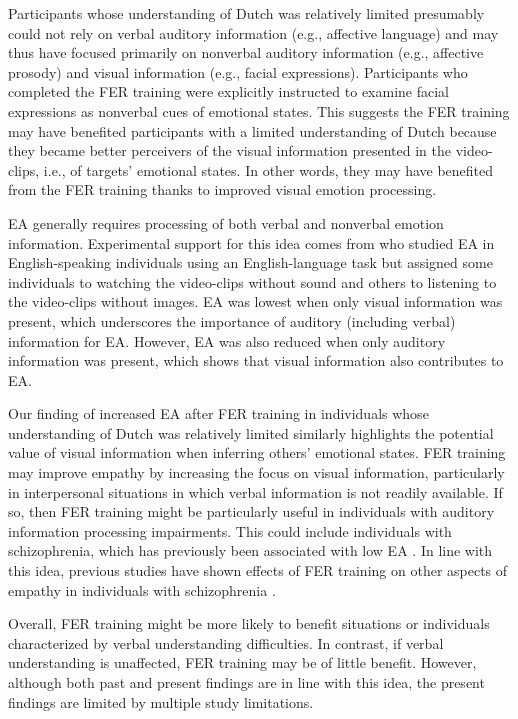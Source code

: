 \documentclass[authordate, empirical]{jote-new-article}
\begin{document}
	Participants whose understanding of Dutch was relatively limited presumably could not rely on verbal auditory information (e.g., affective language) and may thus have focused primarily on nonverbal auditory information (e.g., affective prosody) and visual information (e.g., facial expressions). Participants who completed the FER training were explicitly instructed to examine facial expressions as nonverbal cues of emotional states. This suggests the FER training may have benefited participants with a limited understanding of Dutch because they became better perceivers of the visual information presented in the video-clips, i.e., of targets' emotional states. In other words, they may have benefited from the FER training thanks to improved visual emotion processing.



	EA generally requires processing of both verbal and nonverbal emotion information. Experimental support for this idea comes from \textcite{Zaki2009} who studied EA in English-speaking individuals using an English-language task but assigned some individuals to watching the video-clips without sound and others to listening to the video-clips without images. EA was lowest when only visual information was present, which underscores the importance of auditory (including verbal) information for EA. However, EA was also reduced when only auditory information was present, which shows that visual information also contributes to EA.



	Our finding of increased EA after FER training in individuals whose understanding of Dutch was relatively limited similarly highlights the potential value of visual information when inferring others' emotional states. FER training may improve empathy by increasing the focus on visual information, particularly in interpersonal situations in which verbal information is not readily available. If so, then FER training might be particularly useful in individuals with auditory information processing impairments. This could include individuals with schizophrenia, which has previously been associated with low EA \parencites{Lee2011}. In line with this idea, previous studies have shown effects of FER training on other aspects of empathy in individuals with schizophrenia \parencites{Mazza2010}{Russell2006}{Russell2008}.



	Overall, FER training might be more likely to benefit situations or individuals characterized by verbal understanding difficulties. In contrast, if verbal understanding is unaffected, FER training may be of little benefit. However, although both past and present findings are in line with this idea, the present findings are limited by multiple study limitations.
\end{document}
